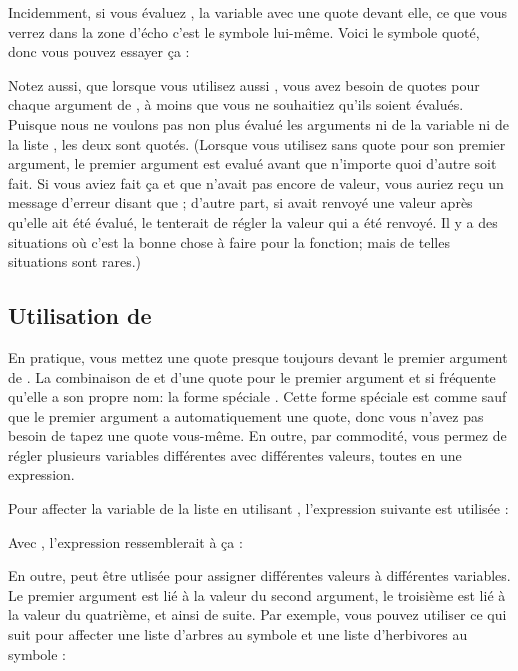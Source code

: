 Incidemment, si vous évaluez , la variable avec une quote
devant elle, ce que vous verrez dans la zone d'écho c'est le symbole
lui-même. Voici le symbole quoté, donc vous pouvez essayer ça :


Notez aussi, que lorsque vous utilisez aussi , vous avez
besoin de quotes pour chaque argument de , à moins que vous ne
souhaitiez qu'ils soient évalués. Puisque nous ne voulons pas non plus
évalué les arguments ni de la variable  ni de la liste
, les deux sont quotés. (Lorsque
vous utilisez  sans quote pour son premier argument, le
premier argument est evalué avant que n'importe quoi d'autre soit
fait. Si vous aviez fait ça et que  n'avait pas encore de
valeur, vous auriez reçu un message d'erreur disant que ; d'autre part, si  avait
renvoyé une valeur après qu'elle ait été évalué, le  tenterait
de régler la valeur qui a été renvoyé. Il y a des situations où c'est
la bonne chose à faire pour la fonction; mais de telles situations
sont rares.)

\subsection{Utilisation de }

En pratique, vous mettez une quote presque toujours devant le premier
argument de . La combinaison de  et d'une quote pour
le premier argument et si fréquente qu'elle a son propre nom: la forme
spéciale . Cette forme spéciale est comme  sauf que
le premier argument a automatiquement une quote, donc vous n'avez pas
besoin de tapez une quote vous-même. En outre, par commodité,
 vous permez de régler plusieurs variables différentes avec
différentes valeurs, toutes en une expression.

Pour affecter la variable  de la liste  en utilisant , l'expression suivante est utilisée
:


Avec , l'expression ressemblerait à ça :


En outre,  peut être utlisée pour assigner différentes
valeurs à différentes variables. Le premier argument est lié à la
valeur du second argument, le troisième est lié à la valeur du
quatrième, et ainsi de suite. Par exemple, vous pouvez utiliser ce qui
suit pour affecter une liste d'arbres au symbole  et une
liste d'herbivores au symbole  : 

